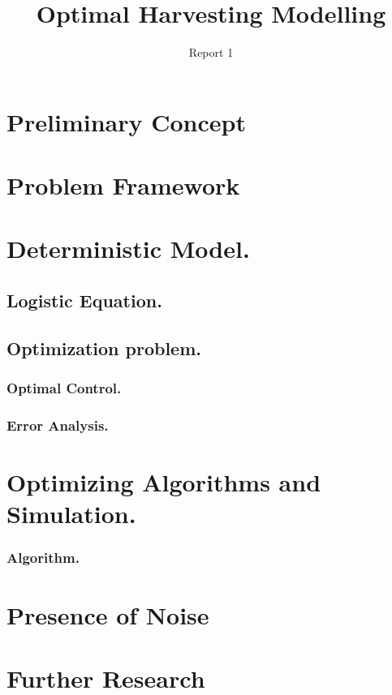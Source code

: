 \documentclass[twoside,colorback,accentcolor=tud4c,11pt]{tudreport}
\title{Optimal Harvesting Modelling}
\subtitle{Report 1}
\begin{document}
\maketitle
\begin{abstract}

\end{abstract}  

\tableofcontents
\chapter{Preliminary Concept} \label{chap:Preliminary}

\chapter{Problem Framework}\label{chap:Problem Framework}

\chapter{Deterministic Model.} \label{chap: Deterministic Model}
\section{Logistic Equation.}
\section{Optimization problem.}

\subsection{Optimal Control.}
\subsection{Error Analysis.}
\chapter{Optimizing Algorithms and Simulation.}
\subsection{Algorithm.}
\subsection{}
\chapter{Presence of Noise}\label{chap: Population Functional}

\chapter{Further Research}\label{chap: Further Enhancements}
\end{document}
